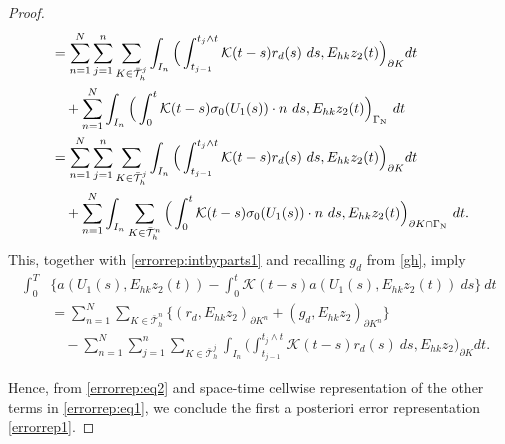 \documentclass{amsart}
\numberwithin{equation}{section}
\theoremstyle{definition}
\begin{document}
\begin{proof}
\begin{equation*}
\begin{split}
    &=\sum_{n=1}^N \sum_{j=1}^n\sum_{K\in\bar{\mathcal T}_h^j}
       \int_{I_n}\Big(\int_{t_{j-1}}^{t_j\wedge t}{\mathcal K}(t-s)r_d(s)\ ds,
         E_{hk}z_2(t)\Big)_{\partial K}dt\\
    &\quad +\sum_{n=1}^N\int_{I_n}
       \Big(\int_0^t {\mathcal K}(t-s) \sigma_0(U_1(s))\cdot n\ ds,E_{hk}z_2(t) 
      \Big)_{\Gamma_{\text N}}\ dt\\
    &=\sum_{n=1}^N \sum_{j=1}^n\sum_{K\in\bar{\mathcal T}_h^j}
       \int_{I_n}\Big(\int_{t_{j-1}}^{t_j\wedge t}{\mathcal K}(t-s)r_d(s)\ ds,
         E_{hk}z_2(t)\Big)_{\partial K}dt\\
    &\quad +\sum_{n=1}^N\int_{I_n}\sum_{K\in\bar{\mathcal T}_h^n}
       \Big(\int_0^t {\mathcal K}(t-s) \sigma_0(U_1(s))\cdot n\ ds,E_{hk}z_2(t) 
      \Big)_{\partial K \cap \Gamma_{\text N}}\ dt.
  \end{split}
\end{equation*}
This, together with \eqref{errorrep:intbyparts1} and 
recalling $g_d$ from \eqref{gh}, imply
\begin{equation}   \label{errorrep:eq2}
  \begin{split}
    \int_0^T\! 
    &\Big\{a(U_1(s),E_{hk}z_2(t)) 
       -\int_0^t\! {\mathcal K}(t-s)a(U_1(s),E_{hk}z_2(t))\ ds
       \Big\}\ dt\\
    &=\sum_{n=1}^N \sum_{K\in\bar{\mathcal T}_h^n}
      \Big\{(r_d,E_{hk}z_2)_{\partial K^n} 
        + (g_d,E_{hk}z_2)_{\partial K^n}\Big\}\\
    &\quad -\sum_{n=1}^N \sum_{j=1}^n\sum_{K\in\bar{\mathcal T}_h^j}
       \int_{I_n}\Big(\int_{t_{j-1}}^{t_j\wedge t}{\mathcal K}(t-s)r_d(s)\ ds,
         E_{hk}z_2\Big)_{\partial K}dt.
  \end{split}
\end{equation}

Hence, from \eqref{errorrep:eq2} and space-time cellwise
representation of the other terms in \eqref{errorrep:eq1}, 
we conclude the first  a posteriori error representation
\eqref{errorrep1}.


\end{proof}
\end{document}
